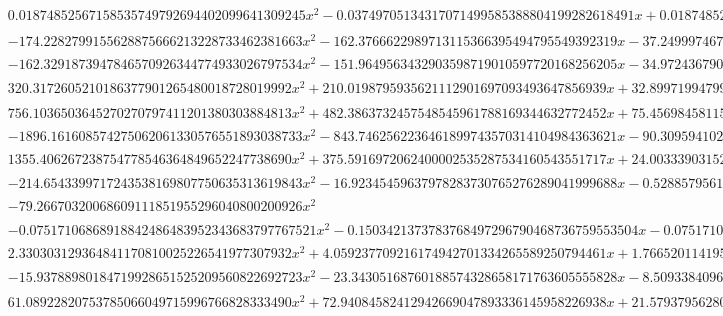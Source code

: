 \documentclass{article}
\begin{document}
\begin{landscape}
\begin{eqnarray*}
\begin{array}{cc}
\begin{array}{cc}
 0.01874852567158535749792694402099641309245 x^2-0.03749705134317071499585388804199282618491 x+0.01874852567158535749792694402099641309245 & \left(x\geq \frac{7}{8}\land x<\frac{15}{16}\right)\lor \left(x\geq \frac{15}{16}\land x<1\right) \\
 -174.2282799155628875666213228733462381663 x^2-162.3766622989713115366395494795549392319 x-37.24999746796999419414963694098004096108 & x\geq -\frac{1}{2}\land x<-\frac{7}{16} \\
 -162.3291873947846570926344774933026797534 x^2-151.9649563432903598719010597720168256205 x-34.97243679016478601748809231745607860860 & x\geq -\frac{7}{16}\land x<-\frac{3}{8} \\
 320.3172605210186377901265480018728019992 x^2+210.0198795935621112901697093493647856939 x+32.89971994799505232540017689280297351287 & x\geq -\frac{3}{8}\land x<-\frac{5}{16} \\
 756.1036503645270270797411201380303884813 x^2+482.3863732457548545961788169344632772452 x+75.45698458115016846696409995297461281776 & x\geq -\frac{5}{16}\land x<-\frac{1}{4} \\
 -1896.161608574275062061330576551893038733 x^2-843.7462562236461899743570314104984363621 x-90.30959410252496210435288109014560138316 & x\geq -\frac{1}{4}\land x<-\frac{3}{16} \\
 1355.406267238754778546364849652247738690 x^2+375.5916972062400002535287534160543551717 x+24.00333903152686822951141123734372282314 & x\geq -\frac{3}{16}\land x<-\frac{1}{8} \\
 -214.6543399717243538169807750635313619843 x^2-16.92345459637978283730765276289041999688 x-0.5288579561368682136658641488403256249024 & x\geq -\frac{1}{8}\land x<-\frac{1}{16} \\
 -79.26670320068609111851955296040800200926 x^2 & x\geq -\frac{1}{16}\land x<0 \\
 -0.07517106868918842486483952343683797767521 x^2-0.1503421373783768497296790468736759553504 x-0.07517106868918842486483952343683797767521 & x\geq -1\land x<-\frac{7}{8} \\
 2.330303129364841170810025226541977307932 x^2+4.059237709216174942701334265589250794461 x+1.766520114195927984323728800765692475367 & x\geq -\frac{7}{8}\land x<-\frac{3}{4} \\
 -15.93788980184719928651525209560822692723 x^2-23.34305168760188574328658171763605555828 x-8.509338409610844772921739692943797406911 & x\geq -\frac{3}{4}\land x<-\frac{5}{8} \\
 61.08922820753785066049715996766828333490 x^2+72.94084582412942669047893336145958226938 x+21.57937956280519036262998376927358941423 & x\geq -\frac{5}{8}\land x<-\frac{1}{2}
\end{array}


\end{array}
\end{eqnarray*}
\end{landscape}
\end{document}
